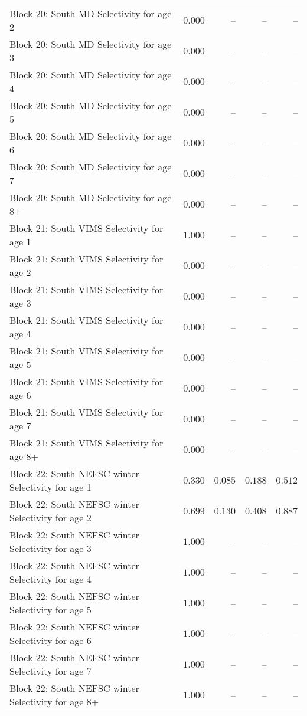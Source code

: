\documentclass[
]{article}
\begin{document}
\begin{landscape}
\begin{longtable}[t]{lrrrr}
\addlinespace
Block 20: South MD Selectivity for age 2 & $0.000$ & -- & -- & --\\
Block 20: South MD Selectivity for age 3 & $0.000$ & -- & -- & --\\
Block 20: South MD Selectivity for age 4 & $0.000$ & -- & -- & --\\
Block 20: South MD Selectivity for age 5 & $0.000$ & -- & -- & --\\
Block 20: South MD Selectivity for age 6 & $0.000$ & -- & -- & --\\
\addlinespace
Block 20: South MD Selectivity for age 7 & $0.000$ & -- & -- & --\\
Block 20: South MD Selectivity for age 8+ & $0.000$ & -- & -- & --\\
Block 21: South VIMS Selectivity for age 1 & $1.000$ & -- & -- & --\\
Block 21: South VIMS Selectivity for age 2 & $0.000$ & -- & -- & --\\
Block 21: South VIMS Selectivity for age 3 & $0.000$ & -- & -- & --\\
\addlinespace
Block 21: South VIMS Selectivity for age 4 & $0.000$ & -- & -- & --\\
Block 21: South VIMS Selectivity for age 5 & $0.000$ & -- & -- & --\\
Block 21: South VIMS Selectivity for age 6 & $0.000$ & -- & -- & --\\
Block 21: South VIMS Selectivity for age 7 & $0.000$ & -- & -- & --\\
Block 21: South VIMS Selectivity for age 8+ & $0.000$ & -- & -- & --\\
\addlinespace
Block 22: South NEFSC winter Selectivity for age 1 & $0.330$ & $0.085$ & $0.188$ & $0.512$\\
Block 22: South NEFSC winter Selectivity for age 2 & $0.699$ & $0.130$ & $0.408$ & $0.887$\\
Block 22: South NEFSC winter Selectivity for age 3 & $1.000$ & -- & -- & --\\
Block 22: South NEFSC winter Selectivity for age 4 & $1.000$ & -- & -- & --\\
Block 22: South NEFSC winter Selectivity for age 5 & $1.000$ & -- & -- & --\\
\addlinespace
Block 22: South NEFSC winter Selectivity for age 6 & $1.000$ & -- & -- & --\\
Block 22: South NEFSC winter Selectivity for age 7 & $1.000$ & -- & -- & --\\
Block 22: South NEFSC winter Selectivity for age 8+ & $1.000$ & -- & -- & --\\

\end{longtable}
\end{landscape}
\end{document}
